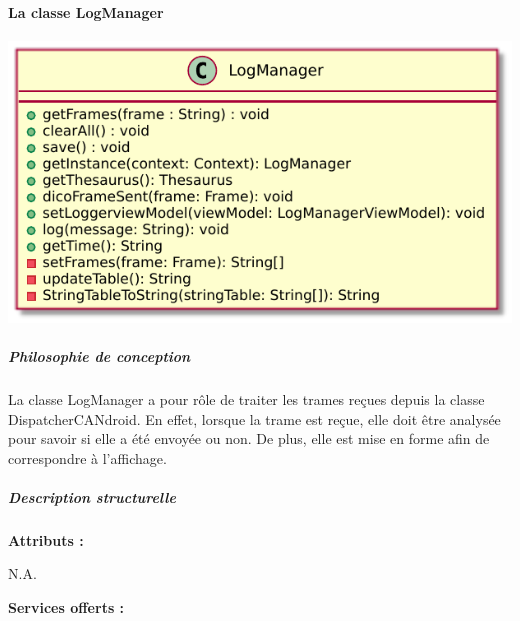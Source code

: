 \paragraph{La classe LogManager}

\begin{minipage}
    {\linewidth}
    \centering
    \includegraphics[width=0.80\linewidth]{../schemas/Conception_detaillee/classe_LogManager.pdf}
\end{minipage}

\subparagraph{Philosophie de conception \newline} 

\medspace

La classe LogManager a pour rôle de traiter les trames reçues depuis la classe DispatcherCANdroid. En effet, lorsque la trame est reçue, elle doit être analysée pour savoir si elle a été envoyée ou non. De plus, elle est mise en forme afin de correspondre à l'affichage. 

\subparagraph{Description structurelle \newline}

\medspace

\textbf{Attributs :}

N.A.

\textbf{Services offerts :}

